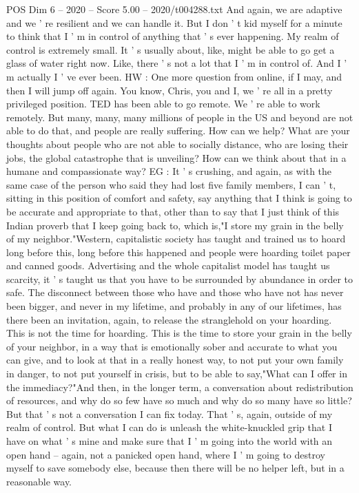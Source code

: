 \begin{textsample}{POS Dim 6 – 2020 – Score 5.00 – 2020/t004288.txt}
And again, we are adaptive and we ' re resilient and we can handle it.
But I don ' t kid myself for a minute to think that I ' m in control of anything that ' s ever happening.
My realm of control is extremely small.
It ' s usually about, like, might be able to go get a glass of water right now.
Like, there ' s not a lot that I ' m in control of.
And I ' m actually I ' ve ever been.
HW : One more question from online, if I may, and then I will jump off again.
You know, Chris, you and I, we ' re all in a pretty privileged position.
TED has been able to go remote.
We ' re able to work remotely.
But many, many, many millions of people in the US and beyond are not able to do that, and people are really suffering.
How can we help?
What are your thoughts about people who are not able to socially distance, who are losing their jobs, the global catastrophe that is unveiling?
How can we think about that in a humane and compassionate way?
EG : It ' s crushing, and again, as with the same case of the person who said they had lost five family members, I can ' t, sitting in this position of comfort and safety, say anything that I think is going to be accurate and appropriate to that, other than to say that I just think of this Indian proverb that I keep going back to, which is,"I store my grain in the belly of my neighbor."Western, capitalistic society has taught and trained us to hoard long before this, long before this happened and people were hoarding toilet paper and canned goods.
Advertising and the whole capitalist model has taught us scarcity, it ' s taught us that you have to be surrounded by abundance in order to safe.
The disconnect between those who have and those who have not has never been bigger, and never in my lifetime, and probably in any of our lifetimes, has there been an invitation, again, to release the stranglehold on your hoarding.
This is not the time for hoarding.
This is the time to store your grain in the belly of your neighbor, in a way that is emotionally sober and accurate to what you can give, and to look at that in a really honest way, to not put your own family in danger, to not put yourself in crisis, but to be able to say,"What can I offer in the immediacy?"And then, in the longer term, a conversation about redistribution of resources, and why do so few have so much and why do so many have so little?
But that ' s not a conversation I can fix today.
That ' s, again, outside of my realm of control.
But what I can do is unleash the white-knuckled grip that I have on what ' s mine and make sure that I ' m going into the world with an open hand -- again, not a panicked open hand, where I ' m going to destroy myself to save somebody else, because then there will be no helper left, but in a reasonable way.

\end{textsample}
